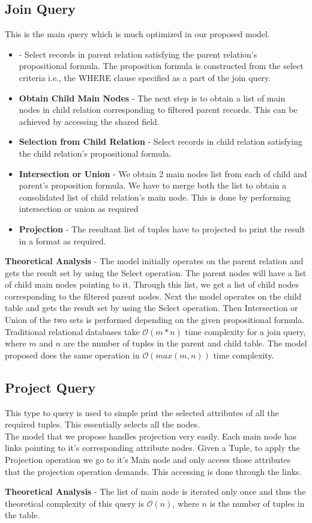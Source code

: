 \documentclass[12pt, oneside]{book}
\begin{document}
\subsection{Join Query}
This is the main query which is much optimized in our proposed model.
\begin{itemize}
  \item {} - Select records in parent relation satisfying the parent relation's propositional formula. The proposition formula is constructed from the select criteria i.e., the WHERE clause specified as a part of the join query.
  \item \textbf{Obtain Child Main Nodes} - The next step is to obtain a list of main nodes in child relation corresponding to filtered parent records. This can be achieved by accessing the shared field.
  \item \textbf{Selection from Child Relation} - Select records in child relation satisfying the child relation's propositional formula.
  \item \textbf{Intersection or Union} - We obtain 2 main nodes list from each of child and parent's proposition formula. We have to merge both the list to obtain a consolidated list of child relation's main node. This is done by performing intersection or union as required
  \item \textbf{Projection} - The resultant list of tuples have to projected to print the result in a format as required.
 \end{itemize}
 \par \textbf{Theoretical Analysis} - The model initially operates on the parent relation and gets the result set by using the Select operation. The parent nodes will have a list of child main nodes pointing to it. Through this list, we get a list of child nodes corresponding to the filtered parent nodes. Next the model operates on the child table and gets the result set by using the Select operation. Then Intersection or Union of the two sets is performed depending on the given propositional formula. Traditional relational databases take $\mathcal{O}(m * n)$ time complexity for a join query, where $m$ and $n$ are the number of tuples in the parent and child table. The model proposed does the same operation in $\mathcal{O}(max(m, n))$ time complexity.
 \subsection{Project Query}
 This type to query is used to simple print the selected attributes of all the required tuples. This essentially selects all the nodes. \\
 The model that we propose handles projection very easily. Each main node has links pointing to it's corresponding attribute nodes. Given a Tuple, to apply the Projection operation we go to it's Main node and only access those attributes that the projection operation demands. This accessing is done through the links.
 \par \textbf{Theoretical Analysis} - The list of main node is iterated only once and thus the theoretical complexity of this query is $\mathcal{O}(n)$, where $n$ is the number of tuples in the table.
 
\end{document}
